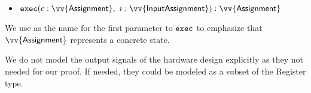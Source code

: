 \begin{itemize}
\item $\concexecution (\concstate: \vv{\textsf{Assignment}},~
  i: \vv{\textsf{InputAssignment}}) : \vv{\textsf{Assignment}}$
\end{itemize}
       
We use \concstate{} as the name for the first parameter
to $\mathtt{exec}$ to emphasize that $\vv{\textsf{Assignment}}$ represents a
concrete state.

We do not model the output signals of the hardware design explicitly as they not needed
for our proof. If needed, they could be modeled as a subset of the \textsf{Register} type.


